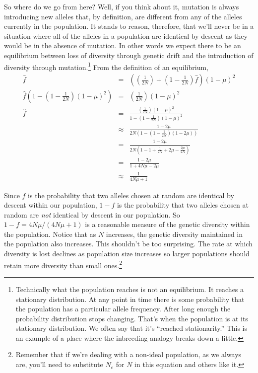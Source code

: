 \documentclass[12pt]{article}
\begin{document}
So where do we go from here? Well, if you think about it, mutation is
always introducing new alleles that, by definition, are different from
any of the alleles currently in the population. It stands to reason,
therefore, that we'll never be in a situation where all of the alleles
in a population are identical by descent as they would be in the
absence of mutation. In other words we expect there to be an
equilibrium between loss of diversity through genetic drift and the
introduction of diversity through mutation.\footnote{Technically what
  the population reaches is not an equilibrium. It reaches a
  stationary distribution. At any point in time there is some
  probability that the population has a particular allele
  frequency. After long enough the probability distribution stops
  changing. That's when the population is at its stationary
  distribution. We often say that it's ``reached stationarity.'' This
  is an example of a place where the inbreeding analogy breaks down a
  little.} From the
definition of an equilibrium,
\begin{eqnarray*}
\hat f &=& \left(\left(\frac{1}{2N}\right) +
          \left(1 - \frac{1}{2N}\right)\hat f\right)(1-\mu)^2 \\
\hat f\left(1 -
\left(1 - \frac{1}{2N}\right)(1-\mu)^2\right)
       &=& \left(\frac{1}{2N}\right)(1-\mu)^2 \\
\hat f &=& \frac{\left(\frac{1}{2N}\right)(1-\mu)^2}
           {1 -\left(1 - \frac{1}{2N}\right)(1-\mu)^2} \\
       &\approx& \frac{1 - 2\mu}
           {2N\left(1 - \left(1 - \frac{1}{2N}\right)(1-2\mu)\right)} \\
       &=& \frac{1 - 2\mu}
           {2N\left(1 - 1 + \frac{1}{2N} + 2\mu -
            \frac{2\mu}{2N}\right)} \\
       &=& \frac{1 - 2\mu}{1 + 4N\mu - 2\mu} \\
       &\approx& \frac{1}{4N\mu + 1}
\end{eqnarray*}

Since $f$ is the probability that two alleles chosen at random are
identical by descent within our population, $1-f$ is the probability
that two alleles chosen at random are {\it not\/} identical by descent
in our population. So $1-f = 4N\mu/(4N\mu + 1)$ is a reasonable
measure of the genetic diversity within the population. Notice that as
$N$ increases, the genetic diversity maintained in the population also
increases. This shouldn't be too surprising. The rate at which
diversity is lost declines as population size increases so larger
populations should retain more diversity than small
ones.\footnote{Remember that if we're dealing with a non-ideal
population, as we always are, you'll need to substitute $N_e$ for $N$
in this equation and others like it.}
\end{document}
